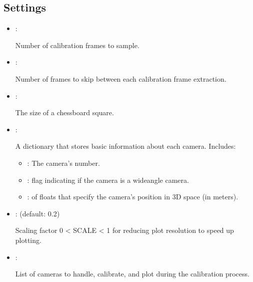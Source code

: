 \documentclass[letterpaper,10pt,english]{sphinxmanual}
\begin{document}
\subsection{Settings}
\label{\detokenize{conf:settings}}\begin{itemize}
\item {} 
\sphinxAtStartPar
{}: 

\sphinxAtStartPar
Number of calibration frames to sample.

\item {} 
\sphinxAtStartPar
{}: 

\sphinxAtStartPar
Number of frames to skip between each calibration frame extraction.

\item {} 
\sphinxAtStartPar
{}: 

\sphinxAtStartPar
The size of a chessboard square.

\item {} 
\sphinxAtStartPar
{}: 

\sphinxAtStartPar
A dictionary that stores basic information about each camera. Includes:
\begin{itemize}
\item {} 
\sphinxAtStartPar
{}: The camera’s number.

\item {} 
\sphinxAtStartPar
{}:  flag indicating if the camera is a wide\sphinxhyphen{}angle camera.

\item {} 
\sphinxAtStartPar
{}:  of floats that specify the camera’s position in 3D space (in meters).

\end{itemize}

\item {} 
\sphinxAtStartPar
{}:  (default: 0.2)

\sphinxAtStartPar
Scaling factor 0 \textless{} SCALE \textless{} 1 for reducing plot resolution to speed up plotting.

\item {} 
\sphinxAtStartPar
{}: 

\sphinxAtStartPar
List of cameras to handle, calibrate, and plot during the calibration process.

\end{itemize}
\end{document}
